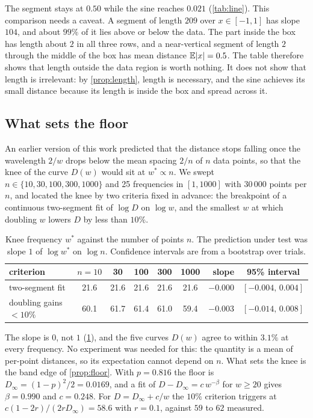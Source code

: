 The segment stays at $0.50$ while the sine reaches $0.021$ (\cref{tab:line}).
This comparison needs a caveat. A segment of length $209$ over $x\in[-1,1]$ has
slope $104$, and about $99\%$ of it lies above or below the data. The part
inside the box has length about $2$ in all three rows, and a near-vertical
segment of length $2$ through the middle of the box has mean distance
$\mathbb{E}|x|=0.5$. The table therefore shows that length outside the data region is
worth nothing. It does not show that length is irrelevant: by
\cref{prop:length}, length is necessary, and the sine achieves its small
distance because its length is inside the box and spread across it.

\subsection{What sets the floor}
\label{sec:saturation}

An earlier version of this work predicted that the distance stops falling once
the wavelength $2/w$ drops below the mean spacing $2/n$ of $n$ data points, so
that the knee of the curve $D(w)$ would sit at $w^\ast\propto n$. We swept
$n\in\{10,30,100,300,1000\}$ and 25 frequencies in $[1,1000]$ with $30\,000$
points per $n$, and located the knee by two criteria fixed in advance: the
breakpoint of a continuous two-segment fit of $\log D$ on $\log w$, and the
smallest $w$ at which doubling $w$ lowers $D$ by less than $10\%$.

\begin{table}[t]
  \caption{Knee frequency $w^\ast$ against the number of points $n$. The
  prediction under test was slope $1$ of $\log w^\ast$ on $\log n$. Confidence
  intervals are from a bootstrap over trials.}
  \label{tab:knee}
  \centering
  \begin{tabular}{lcccccrc}
    \toprule
    criterion & $n=10$ & 30 & 100 & 300 & 1000 & slope & 95\% interval \\
    \midrule
    two-segment fit      & 21.6 & 21.6 & 21.6 & 21.6 & 21.6 & $-0.000$ & $[-0.004,\,0.004]$ \\
    doubling gains $<10\%$ & 60.1 & 61.7 & 61.4 & 61.0 & 59.4 & $-0.003$ & $[-0.014,\,0.008]$ \\
    \bottomrule
  \end{tabular}
\end{table}

The slope is $0$, not $1$ (\cref{tab:knee}), and the five curves $D(w)$ agree to
within $3.1\%$ at every frequency. No experiment was needed for this: the
quantity is a mean of per-point distances, so its expectation cannot depend on
$n$. What sets the knee is the band edge of \cref{prop:floor}. With $p=0.816$
the floor is $D_\infty=(1-p)^2/2=0.0169$, and a fit of
$D-D_\infty=c\,w^{-\beta}$ for $w\ge20$ gives $\beta=0.990$ and $c=0.248$. For
$D=D_\infty+c/w$ the $10\%$ criterion triggers at $c(1-2r)/(2rD_\infty)=58.6$
with $r=0.1$, against $59$ to $62$ measured.

